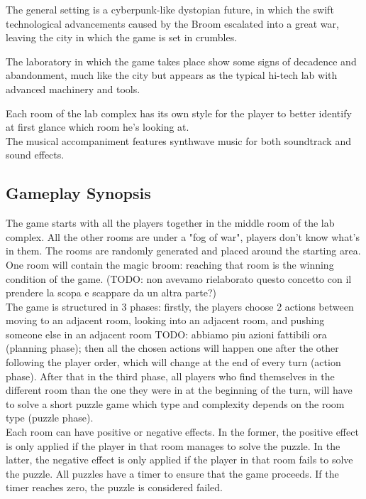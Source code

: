 The general setting is a cyberpunk-like dystopian future, in which the swift technological advancements caused by the Broom escalated into a great war, leaving the city in which the game is set in crumbles.

The laboratory in which the game takes place show some signs of decadence and abandonment, much like the city but appears as the typical hi-tech lab with advanced machinery and tools.


Each room of the lab complex has its own style for the player to better identify at first glance which room he's looking at. \\

The musical accompaniment features synthwave music for both soundtrack and sound effects.

\subsection{Gameplay Synopsis}

The game starts with all the players together in the middle room of the lab complex. All the other rooms are
under a "fog of war", players don't know what's in them. The rooms are randomly generated and placed
around the starting area. One room will contain the magic broom: reaching that room is the winning
condition of the game. (TODO: non avevamo rielaborato questo concetto con il prendere la scopa e scappare da un altra parte?) \\

The game is structured in 3 phases: firstly, the players choose 2 actions between moving to an adjacent
room, looking into an adjacent room, and pushing someone else in an adjacent room TODO: abbiamo piu azioni fattibili ora (planning phase);
then all the chosen actions will happen one after the other following the player order, which will change at the end of every turn (action phase). After that in the third phase, all
players who find themselves in the different room than the one they were in at the beginning of the turn,
will have to solve a short puzzle game which type and complexity depends on the room type (puzzle phase). \\

Each room can have positive or negative effects. In the former, the positive effect is only applied if the
player in that room manages to solve the puzzle. In the latter, the negative effect is only applied if the
player in that room fails to solve the puzzle. All puzzles have a timer to ensure that the game proceeds. If
the timer reaches zero, the puzzle is considered failed. 


\pagebreak
\clearpage 
